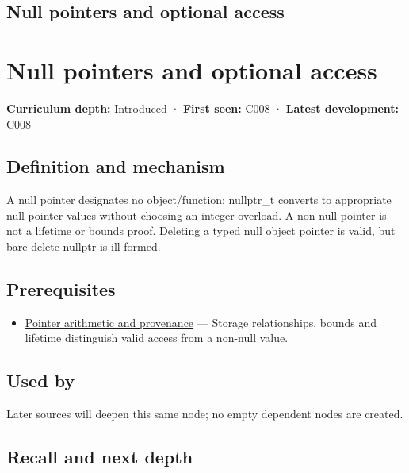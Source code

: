 \hypertarget{appendix-afae48c31800}{}
\section*{Null pointers and optional access}
\chapter{Null pointers and optional access}\label{appendix-afae48c31800-null-pointers-and-optional-access}

\textbf{Curriculum depth:} Introduced · \textbf{First seen:} C008 · \textbf{Latest development:} C008

\section{Definition and mechanism}\label{appendix-afae48c31800-definition-and-mechanism}

A null pointer designates no object/function; nullptr\_t converts to appropriate null pointer values without choosing an integer overload. A non-null pointer is not a lifetime or bounds proof. Deleting a typed null object pointer is valid, but bare delete nullptr is ill-formed.

\section{Prerequisites}\label{appendix-afae48c31800-prerequisites}

\begin{itemize}
\tightlist
\item
  \hyperref[appendix-6af5921bc853]{Pointer arithmetic and provenance} --- Storage relationships, bounds and lifetime distinguish valid access from a non-null value.
\end{itemize}

\section{Used by}\label{appendix-afae48c31800-used-by}

Later sources will deepen this same node; no empty dependent nodes are created.

\section{Recall and next depth}\label{appendix-afae48c31800-recall-and-next-depth}

